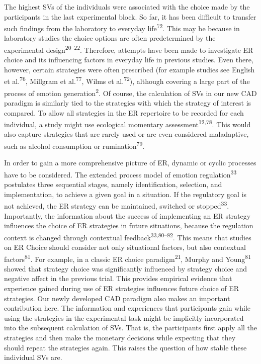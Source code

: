 \documentclass[
  man,floatsintext]{apa6}
\begin{document}
The highest SVs of the individuals were associated with the choice made by the participants in the last experimental block.
So far, it has been difficult to transfer such findings from the laboratory to everyday life\textsuperscript{72}.
This may be because in laboratory studies the choice options are often predetermined by the experimental design\textsuperscript{20--22}.
Therefore, attempts have been made to investigate ER choice and its influencing factors in everyday life in previous studies.
Even there, however, certain strategies were often prescribed (for example studies see English et al.\textsuperscript{76}, Millgram et al.\textsuperscript{77}, Wilms et al.\textsuperscript{72}), although covering a large part of the process of emotion generation\textsuperscript{2}.
Of course, the calculation of SVs in our new CAD paradigm is similarly tied to the strategies with which the strategy of interest is compared.
To allow all strategies in the ER repertoire to be recorded for each individual, a study might use ecological momentary assessment\textsuperscript{12,78}.
This would also capture strategies that are rarely used or are even considered maladaptive, such as alcohol consumption or rumination\textsuperscript{79}.

In order to gain a more comprehensive picture of ER, dynamic or cyclic processes have to be considered.
The extended process model of emotion regulation\textsuperscript{33} postulates three sequential stages, namely identification, selection, and implementation, to achieve a given goal in a situation.
If the regulatory goal is not achieved, the ER strategy can be maintained, switched or stopped\textsuperscript{33}.
Importantly, the information about the success of implementing an ER strategy influences the choice of ER strategies in future situations, because the regulation context is changed through contextual feedback\textsuperscript{33,80--82}.
This means that studies on ER Choice should consider not only situational factors, but also contextual factors\textsuperscript{81}.
For example, in a classic ER choice paradigm\textsuperscript{21}, Murphy and Young\textsuperscript{81} showed that strategy choice was significantly influenced by strategy choice and negative affect in the previous trial.
This provides empirical evidence that experience gained during use of ER strategies influences future choice of ER strategies.
Our newly developed CAD paradigm also makes an important contribution here.
The information and experiences that participants gain while using the strategies in the experimental task might be implicitly incorporated into the subsequent calculation of SVs.
That is, the participants first apply all the strategies and then make the monetary decisions while expecting that they should repeat the strategies again.
This raises the question of how stable these individual SVs are.
\end{document}
